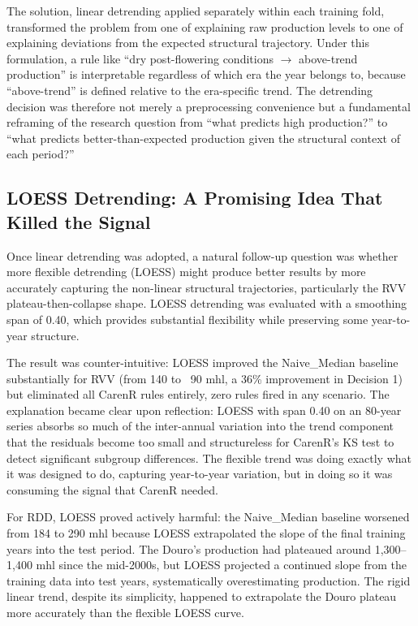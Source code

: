 The solution, linear detrending applied separately within each training fold, transformed the problem from one of explaining raw production levels to one of explaining deviations from the expected structural trajectory. Under this formulation, a rule like ``dry post-flowering conditions $\rightarrow$ above-trend production'' is interpretable regardless of which era the year belongs to, because ``above-trend'' is defined relative to the era-specific trend. The detrending decision was therefore not merely a preprocessing convenience but a fundamental reframing of the research question from ``what predicts high production?'' to ``what predicts better-than-expected production given the structural context of each period?''


\subsection{LOESS Detrending: A Promising Idea That Killed the Signal}\label{sub:loess_detrending_a_promising}

Once linear detrending was adopted, a natural follow-up question was whether more flexible detrending (LOESS) might produce better results by more accurately capturing the non-linear structural trajectories, particularly the RVV plateau-then-collapse shape. LOESS detrending was evaluated with a smoothing span of 0.40, which provides substantial flexibility while preserving some year-to-year structure.

The result was counter-intuitive: LOESS improved the Naive\_Median baseline substantially for RVV (from 140 to ~90 mhl, a 36\% improvement in Decision 1) but eliminated all CarenR rules entirely, zero rules fired in any scenario. The explanation became clear upon reflection: LOESS with span 0.40 on an 80-year series absorbs so much of the inter-annual variation into the trend component that the residuals become too small and structureless for CarenR's KS test to detect significant subgroup differences. The flexible trend was doing exactly what it was designed to do, capturing year-to-year variation, but in doing so it was consuming the signal that CarenR needed.

For RDD, LOESS proved actively harmful: the Naive\_Median baseline worsened from 184 to 290 mhl because LOESS extrapolated the slope of the final training years into the test period. The Douro's production had plateaued around 1,300--1,400 mhl since the mid-2000s, but LOESS projected a continued slope from the training data into test years, systematically overestimating production. The rigid linear trend, despite its simplicity, happened to extrapolate the Douro plateau more accurately than the flexible LOESS curve.

